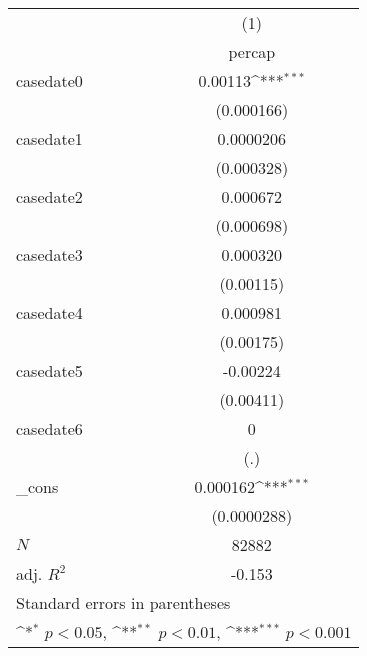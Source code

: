 {
\def\sym#1{\ifmmode^{#1}\else\(^{#1}\)\fi}
\begin{tabular}{l*{1}{c}}
\hline\hline
            &\multicolumn{1}{c}{(1)}\\
            &\multicolumn{1}{c}{percap}\\
\hline
casedate0   &     0.00113\sym{***}\\
            &  (0.000166)         \\
[1em]
casedate1   &   0.0000206         \\
            &  (0.000328)         \\
[1em]
casedate2   &    0.000672         \\
            &  (0.000698)         \\
[1em]
casedate3   &    0.000320         \\
            &   (0.00115)         \\
[1em]
casedate4   &    0.000981         \\
            &   (0.00175)         \\
[1em]
casedate5   &    -0.00224         \\
            &   (0.00411)         \\
[1em]
casedate6   &           0         \\
            &         (.)         \\
[1em]
\_cons      &    0.000162\sym{***}\\
            & (0.0000288)         \\
\hline
\(N\)       &       82882         \\
adj. \(R^{2}\)&      -0.153         \\
\hline\hline
\multicolumn{2}{l}{\footnotesize Standard errors in parentheses}\\
\multicolumn{2}{l}{\footnotesize \sym{*} \(p<0.05\), \sym{**} \(p<0.01\), \sym{***} \(p<0.001\)}\\
\end{tabular}
}
